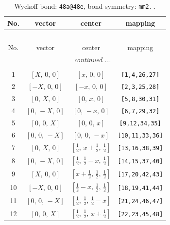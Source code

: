 \documentclass[fleqn,8pt]{jsarticle}
\begin{document}
\begin{longtable}{cccc}
\caption{Wyckoff bond: {\tt 48a@48e}, bond symmetry: {\tt mm2..}}
 \\
 \hline \hline
No. & vector & center & mapping \\ \hline \endfirsthead

\multicolumn{3}{l}{\tablename\ \thetable{}} \\
 \hline \hline
No. & vector & center & mapping \\ \hline \endhead

 \hline \hline
\multicolumn{3}{r}{\footnotesize\it continued ...} \\ \endfoot

 \hline \hline
\multicolumn{3}{r}{} \\ \endlastfoot

1 & $\left[ X,\, 0,\, 0 \right]$ & $\left[ x,\, 0,\, 0 \right]$ & {\tt [1,4,26,27]} \\ \hline
2 & $\left[ - X,\, 0,\, 0 \right]$ & $\left[ - x,\, 0,\, 0 \right]$ & {\tt [2,3,25,28]} \\ \hline
3 & $\left[ 0,\, X,\, 0 \right]$ & $\left[ 0,\, x,\, 0 \right]$ & {\tt [5,8,30,31]} \\ \hline
4 & $\left[ 0,\, - X,\, 0 \right]$ & $\left[ 0,\, - x,\, 0 \right]$ & {\tt [6,7,29,32]} \\ \hline
5 & $\left[ 0,\, 0,\, X \right]$ & $\left[ 0,\, 0,\, x \right]$ & {\tt [9,12,34,35]} \\ \hline
6 & $\left[ 0,\, 0,\, - X \right]$ & $\left[ 0,\, 0,\, - x \right]$ & {\tt [10,11,33,36]} \\ \hline
7 & $\left[ 0,\, X,\, 0 \right]$ & $\left[ \frac{1}{2},\, x + \frac{1}{2},\, \frac{1}{2} \right]$ & {\tt [13,16,38,39]} \\ \hline
8 & $\left[ 0,\, - X,\, 0 \right]$ & $\left[ \frac{1}{2},\, \frac{1}{2} - x,\, \frac{1}{2} \right]$ & {\tt [14,15,37,40]} \\ \hline
9 & $\left[ X,\, 0,\, 0 \right]$ & $\left[ x + \frac{1}{2},\, \frac{1}{2},\, \frac{1}{2} \right]$ & {\tt [17,20,42,43]} \\ \hline
10 & $\left[ - X,\, 0,\, 0 \right]$ & $\left[ \frac{1}{2} - x,\, \frac{1}{2},\, \frac{1}{2} \right]$ & {\tt [18,19,41,44]} \\ \hline
11 & $\left[ 0,\, 0,\, - X \right]$ & $\left[ \frac{1}{2},\, \frac{1}{2},\, \frac{1}{2} - x \right]$ & {\tt [21,24,46,47]} \\ \hline
12 & $\left[ 0,\, 0,\, X \right]$ & $\left[ \frac{1}{2},\, \frac{1}{2},\, x + \frac{1}{2} \right]$ & {\tt [22,23,45,48]} \\
\end{longtable}
\end{document}
